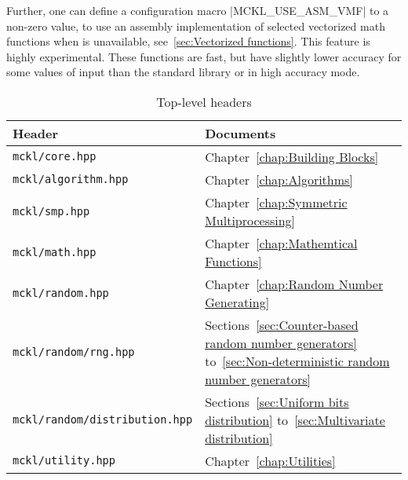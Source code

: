Further, one can define a configuration macro |MCKL_USE_ASM_VMF| to a non-zero
value, to use an assembly implementation of selected vectorized math functions
when \mkl \vml is unavailable, see~\ref{sec:Vectorized functions}. This feature
is highly experimental. These functions are fast, but have slightly lower
accuracy for some values of input than the standard library or \mkl \vml in
high accuracy mode.

\begin{table}[ht]
  \begin{tabularx}{\textwidth}{LL}
    \toprule
    Header & Documents \\
    \midrule
    \texttt{mckl/core.hpp}     & Chapter~\ref{chap:Building Blocks}          \\
    \texttt{mckl/algorithm.hpp}& Chapter~\ref{chap:Algorithms}               \\
    \texttt{mckl/smp.hpp}      & Chapter~\ref{chap:Symmetric Multiprocessing}\\
    \texttt{mckl/math.hpp}     & Chapter~\ref{chap:Mathemtical Functions}    \\
    \texttt{mckl/random.hpp}   & Chapter~\ref{chap:Random Number Generating} \\
    \texttt{mckl/random/rng.hpp}
    & Sections~\ref{sec:Counter-based random number generators}
    to~\ref{sec:Non-deterministic random number generators} \\
    \texttt{mckl/random/distribution.hpp}
    & Sections~\ref{sec:Uniform bits distribution}
    to~\ref{sec:Multivariate distribution} \\
    \texttt{mckl/utility.hpp} & Chapter~\ref{chap:Utilities} \\
    \bottomrule
  \end{tabularx}
  \caption{Top-level headers}
  \label{tab:headers}
\end{table}
